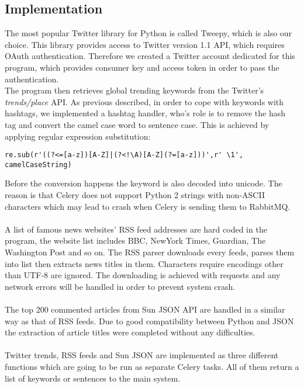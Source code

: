 \subsection{Implementation}
The most popular Twitter library for Python is called Tweepy, which is also 
our choice. This library provides access to Twitter version 1.1 API, which 
requires OAuth authentication. Therefore we created a Twitter account 
dedicated for this program, which provides consumer key and access token in 
order to pass the authentication. \\
The program then retrieves global trending keywords from the Twitter's {\em 
trends/place} API. As previous described, in order to cope with keywords with 
hashtags, we implemented a hashtag handler, who's role is to remove the hash 
tag and convert the camel case word to sentence case. This is achieved by 
applying regular expression substitution: 
\begin{verbatim}
re.sub(r'((?<=[a-z])[A-Z]|(?<!\A)[A-Z](?=[a-z]))',r' \1',
camelCaseString)
\end{verbatim}
Before the conversion happens the keyword is also decoded into unicode. The 
reason is that Celery does not support Python 2 strings with non-ASCII characters
which may lead to 
crash when Celery is sending them to RabbitMQ. 
\paragraph{}
A list of famous news websites' RSS feed addresses are hard coded in the 
program, the website list includes BBC, NewYork Times, Guardian, The Washington 
Post and so on. The RSS parser downloads every feeds, parses them into list 
then extracts news titles in them. Characters require encodings other than 
UTF-8 are ignored. The downloading is achieved with requests and any network 
errors will be handled in order to prevent system crash. 
\paragraph{}
The top 200 commented articles from Sun JSON API are handled in a similar way 
as that of RSS feeds. Due to good compatibility between Python and JSON the 
extraction of article titles were completed without any difficulties. 
\paragraph{}
Twitter trends, RSS feeds and Sun JSON are implemented as three different 
functions which are going to be run as separate Celery tasks. All of them 
return a list of keywords or sentences to the main system. 
